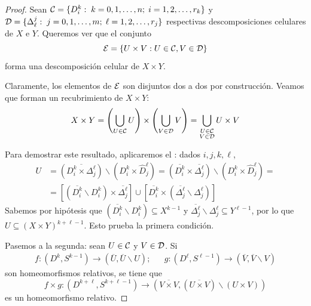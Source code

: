 \begin{proof}
Sean $\mathcal{C}=\{D_i^k:\; k=0,1,\dots,n; \;i=1,2,\dots,r_k\}$ y $\mathcal{D}=
\{\Delta_\ell^j:\; j=0,1,\dots,m; \;\ell=1,2,\dots,r_j\}$ respectivas
descomposiciones celulares de $X$ e $Y$. Queremos ver que el conjunto
\[\mathcal{E}=\{U\times V: U\in \mathcal{C}, V\in \mathcal{D}\}\]
forma una descomposición celular de $X\times Y$.

Claramente, los elementos de $\mathcal{E}$ son disjuntos dos a dos por
construcción. Veamos que forman un recubrimiento de $X\times Y$: 
\[X\times Y=
	\left(\bigcup_{U \in \mathcal{C}} U\right)\times
	\left(\bigcup_{V \in \mathcal{D}} V\right)=
	\bigcup_{\substack{U \in \mathcal{C}\\V \in \mathcal{D}}} U\times V\]

Para demostrar este resultado, aplicaremos el : dados
$i,j,k,\ell$,
\begin{align*}
U&=(\overline{D^k_i\times \Delta^\ell_j})\backslash
	(D^k_i\times \hat D^\ell_j)=
	(\overline{D^k_i}\times \overline{\Delta^\ell_j})\backslash
	(D^k_i\times \hat D^\ell_j)=\\
	&=[(\overline{D^k_i}\backslash D^k_i)\times \overline{\Delta^\ell_j}]\cup
	[\overline{D^k_i}\times (\overline{\Delta^\ell_j}\backslash \Delta^\ell_j)]
\end{align*}
Sabemos por hipótesis que $(\overline{D^k_i}\backslash D^k_i) \subseteq
X^{k-1}$ y $\overline{\Delta^\ell_j}\backslash \Delta^\ell_j \subseteq
Y^{\ell-1}$, por lo que $U \subseteq (X\times Y)^{k+\ell-1}$. Esto prueba la
primera condición.

Pasemos a la segunda: sean $U \in \mathcal{C}$ y $V \in \mathcal{D}$. Si
\begin{align*}
f\colon (D^k,S^{k-1}) \to (\overline{U},\overline{U}\backslash U); &&
g\colon (D^\ell,S^{\ell-1}) \to (\overline{V},\overline{V}\backslash V)
\end{align*}
son homeomorfismos relativos, se tiene que
\[f\times g\colon (D^{k+\ell},S^{k+\ell-1}) \to
(\overline{V\times V},(\overline{U\times V})\backslash (U\times V))\]
es un homeomorfismo relativo.
\end{proof}

